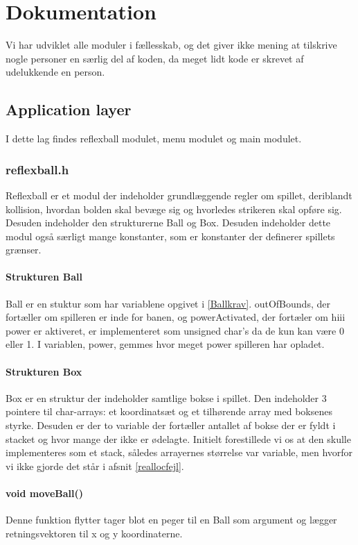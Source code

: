 \section{Dokumentation}
Vi har udviklet alle moduler i fællesskab, og det giver ikke mening at tilskrive nogle personer en særlig del af koden, da meget lidt kode er skrevet af udelukkende en person. 

\subsection{Application layer}
I dette lag findes reflexball modulet, menu modulet og main modulet.
\subsubsection{reflexball.h}
Reflexball er et modul der indeholder grundlæggende regler om spillet, deriblandt kollision, hvordan bolden skal bevæge sig og hvorledes strikeren skal opføre sig. Desuden indeholder den strukturerne Ball og Box. Desuden indeholder dette modul også særligt mange konstanter, som er konstanter der definerer spillets grænser.
\paragraph{Strukturen Ball}
Ball er en stuktur som har variablene opgivet i \ref{Ballkrav}. outOfBounds, der fortæller om spilleren er inde for banen, og powerActivated, der fortæler om hiii power er aktiveret, er implementeret som unsigned char's da de kun kan være 0 eller 1. I variablen, power, gemmes hvor meget power spilleren har opladet.
 

\paragraph{Strukturen Box}
Box er en struktur der indeholder samtlige bokse i spillet. Den indeholder 3 pointere til char-arrays: et koordinatsæt og et tilhørende array med boksenes styrke. Desuden er der to variable der fortæller antallet af bokse der er fyldt i stacket og hvor mange der ikke er ødelagte. Initielt forestillede vi os at den skulle implementeres som et stack, således arrayernes størrelse var variable, men hvorfor vi ikke gjorde det står i afsnit \ref{reallocfejl}.
\paragraph{void moveBall()}
Denne funktion flytter tager blot en peger til en Ball som argument og lægger retningsvektoren til x og y koordinaterne.
